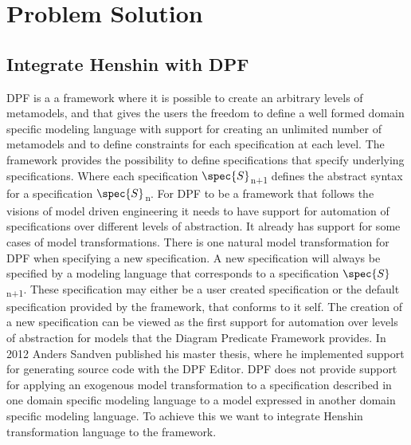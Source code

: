 
\chapter{Problem Solution} %

\label{Chapter6} %



\section{Integrate Henshin with DPF}

DPF is a a framework where it is possible to create an arbitrary levels of
metamodels, and that gives the users the freedom to define a well formed domain
specific modeling language with support for creating an unlimited number of
metamodels and to define constraints for each specification at each level. The
framework provides the possibility to define specifications that specify
underlying specifications. Where each specification
$\spec{S}$\textsubscript{n+1} defines the abstract syntax for a specification
$\spec{S}$\textsubscript{n}. For DPF to be a framework that follows the visions
of model driven engineering it needs to have support for automation of
specifications over different levels of abstraction. It already has support for
some cases of model transformations. There is one natural model transformation
for DPF when specifying a new specification. A new specification will always
be specified by a modeling language that corresponds to a specification
$\spec{S}$\textsubscript{n+1}. These specification may either be a user created
specification or the default specification provided by the framework, that
conforms to it self. The creation of a new specification can be viewed as the
first support for automation over levels of abstraction for models that the
Diagram Predicate Framework provides. In 2012 Anders Sandven published his
master thesis\cite{Sandven_thesis}, where he implemented support for generating
source code with the DPF Editor. DPF does not provide support for applying an
exogenous model transformation to a specification described in one domain
specific modeling language to a model expressed in another domain specific
modeling language. To achieve this we want to integrate Henshin transformation
language\cite{Arendt2010} to the framework.  

